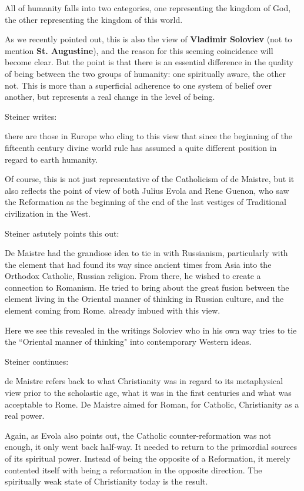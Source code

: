 \begin{quotex}
All of humanity falls into two categories, one representing the kingdom of God, the other representing the kingdom of this world. 

\end{quotex}
As we recently pointed out, this is also the view of \textbf{Vladimir Soloviev} (not to mention \textbf{St. Augustine}), and the reason for this seeming coincidence will become clear. But the point is that there is an essential difference in the quality of being between the two groups of humanity: one spiritually aware, the other not. This is more than a superficial adherence to one system of belief over another, but represents a real change in the level of being.

Steiner writes:

\begin{quotex}
there are those in Europe who cling to this view that since the beginning of the fifteenth century divine world rule has assumed a quite different position in regard to earth humanity. 

\end{quotex}
Of course, this is not just representative of the Catholicism of de Maistre, but it also reflects the point of view of both Julius Evola and Rene Guenon, who saw the Reformation as the beginning of the end of the last vestiges of Traditional civilization in the West.

Steiner astutely points this out:

\begin{quotex}
De Maistre had the grandiose idea to tie in with Russianism, particularly with the element that had found its way since ancient times from Asia into the Orthodox Catholic, Russian religion. From there, he wished to create a connection to Romanism. He tried to bring about the great fusion between the element living in the Oriental manner of thinking in Russian culture, and the element coming from Rome. already imbued with this view. 

\end{quotex}
Here we see this revealed in the writings Soloviev who in his own way tries to tie the ``Oriental manner of thinking" into contemporary Western ideas.

Steiner continues:

\begin{quotex}
de Maistre refers back to what Christianity was in regard to its metaphysical view prior to the scholastic age, what it was in the first centuries and what was acceptable to Rome. De Maistre aimed for Roman, for Catholic, Christianity as a real power.

\end{quotex}
Again, as Evola also points out, the Catholic counter-reformation was not enough, it only went back half-way. It needed to return to the primordial sources of its spiritual power. Instead of being the opposite of a Reformation, it merely contented itself with being a reformation in the opposite direction. The spiritually weak state of Christianity today is the result.

